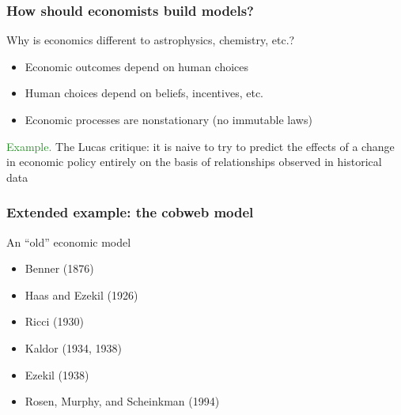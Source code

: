 \documentclass[
    xcolor={svgnames,dvipsnames},
    hyperref={colorlinks, citecolor=DeepPink4, linkcolor=DarkRed, urlcolor=DarkBlue}
    ]{beamer}  %
\newcommand{\Eg}{\textcolor{ForestGreen}{Example. }}
\newcommand{\1}{\mathbbm 1}
\begin{document}
\begin{frame}
    \frametitle{How should economists build models?}

    Why is economics different to astrophysics, chemistry, etc.?

    \begin{itemize}
        \item Economic outcomes depend on human choices
            \vspace{0.3em}
        \item Human choices depend on beliefs, incentives, etc.
            \vspace{0.3em}
        \item Economic processes are nonstationary (no immutable laws)
    \end{itemize}

            \vspace{0.3em}
            \vspace{0.3em}
            \vspace{0.3em}

    \Eg The Lucas critique: it is naive to try to predict the effects
        of a change in economic policy entirely on the basis of relationships
        observed in historical data

\end{frame}

\begin{frame}
    \frametitle{Extended example: the cobweb model}

    An ``old'' economic model

    \begin{itemize}
        \item Benner (1876)
        \item Haas and Ezekil (1926)
        \item Ricci (1930)
        \item Kaldor (1934, 1938)
        \item Ezekil (1938)
        \item Rosen, Murphy, and Scheinkman (1994)
    \end{itemize}

\end{frame}
\end{document}
